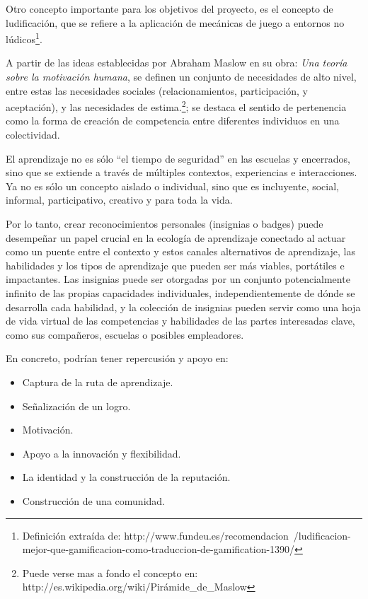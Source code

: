 Otro concepto importante para los objetivos del proyecto, es el concepto de
ludificación, que se refiere a la aplicación de mecánicas de juego a entornos
no lúdicos\footnote{Definición extraída de: http://www.fundeu.es/recomendacion\
/ludificacion-mejor-que-gamificacion-como-traduccion-de-gamification-1390/}.

A partir de las ideas establecidas por Abraham Maslow en su obra: \emph{Una
teoría sobre la motivación humana}, se definen un conjunto de necesidades de
alto nivel, entre estas las necesidades sociales (relacionamientos,
participación, y aceptación), y las necesidades de estima.\footnote{Puede verse
mas a fondo el concepto en:
http://es.wikipedia.org/wiki/Pirámide\_de\_Maslow}; se destaca el sentido de
pertenencia como la forma de creación de competencia entre diferentes
individuos en una colectividad.\cite{Venegas}

El aprendizaje no es sólo “el tiempo de seguridad” en las escuelas y encerrados,
sino que se extiende a través de múltiples contextos, experiencias e
interacciones. Ya no es sólo un concepto aislado o individual, sino que es
incluyente, social, informal, participativo, creativo y para toda la vida.

Por lo tanto, crear reconocimientos personales (insignias o badges) puede
desempeñar un papel crucial en la ecología de aprendizaje conectado al actuar
como un puente entre el contexto y estos canales alternativos de aprendizaje,
las habilidades y los tipos de aprendizaje que pueden ser más viables,
portátiles e impactantes. Las insignias puede ser otorgadas por un conjunto
potencialmente infinito de las propias capacidades individuales, 
independientemente de dónde se desarrolla cada habilidad, y la colección de
insignias pueden servir como una hoja de vida virtual de las competencias y
habilidades de las partes interesadas clave, como sus compañeros, escuelas o
posibles empleadores\cite{Santamaria}.

En concreto, podrían tener repercusión y apoyo en:

\begin{itemize}
\item Captura de la ruta de aprendizaje.
\item Señalización de un logro.
\item Motivación.
\item Apoyo a la innovación y flexibilidad.
\item La identidad y la construcción de la reputación.
\item Construcción de una comunidad.
\end{itemize}

